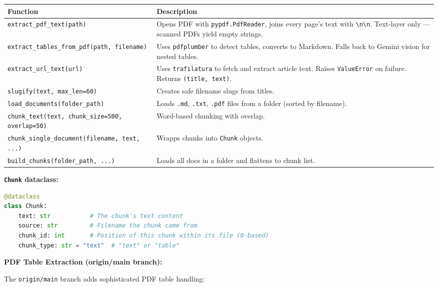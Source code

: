 \documentclass[11pt,a4paper]{paper}
\begin{document}
\begin{longtable}{>{\ttfamily}l >{\raggedright\arraybackslash}p{10.5cm}}
\toprule
\textbf{Function} & \textbf{Description} \\
\midrule
\endhead
\texttt{extract\_pdf\_text(path)} & Opens PDF with \texttt{pypdf.PdfReader}, joins every page's text with \texttt{\textbackslash n\textbackslash n}. Text-layer only — scanned PDFs yield empty strings. \\
\texttt{extract\_tables\_from\_pdf(path, filename)} & Uses \texttt{pdfplumber} to detect tables, converts to Markdown. Falls back to Gemini vision for nested tables. \\
\texttt{extract\_url\_text(url)} & Uses \texttt{trafilatura} to fetch and extract article text. Raises \texttt{ValueError} on failure. Returns \texttt{(title, text)}. \\
\texttt{slugify(text, max\_len=60)} & Creates safe filename slugs from titles. \\
\texttt{load\_documents(folder\_path)} & Loads \texttt{.md}, \texttt{.txt}, \texttt{.pdf} files from a folder (sorted by filename). \\
\texttt{chunk\_text(text, chunk\_size=500, overlap=50)} & Word-based chunking with overlap. \\
\texttt{chunk\_single\_document(filename, text, ...)} & Wrapps chunks into \texttt{Chunk} objects. \\
\texttt{build\_chunks(folder\_path, ...)} & Loads all docs in a folder and flattens to chunk list. \\
\bottomrule
\end{longtable}
\label{tab:ingest-functions}

\textbf{\texttt{Chunk} dataclass:}

\begin{lstlisting}[language=Python, style=pythonstyle, caption={Chunk dataclass definition.}, label=lst:chunk]
@dataclass
class Chunk:
    text: str           # The chunk's text content
    source: str         # Filename the chunk came from
    chunk_id: int       # Position of this chunk within its file (0-based)
    chunk_type: str = "text"  # "text" or "table"
\end{lstlisting}

\textbf{PDF Table Extraction (origin/main branch):}

The \texttt{origin/main} branch adds sophisticated PDF table handling:
\end{document}
